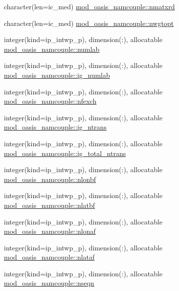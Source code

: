 \begin{DoxyCompactItemize}
\item 
character(len=ic\+\_\+med) \hyperlink{namespacemod__oasis__namcouple_a7cb9d88a57224d84d97afc29b0e606bf}{mod\+\_\+oasis\+\_\+namcouple\+::nmatxrd}
\item 
character(len=ic\+\_\+med) \hyperlink{namespacemod__oasis__namcouple_ad7829e2434eb8214b599ba49395c9fc5}{mod\+\_\+oasis\+\_\+namcouple\+::nwgtopt}
\item 
integer(kind=ip\+\_\+intwp\+\_\+p), dimension(\+:), allocatable \hyperlink{namespacemod__oasis__namcouple_a12e1621f5697a0cdbde11d3e25f43b54}{mod\+\_\+oasis\+\_\+namcouple\+::numlab}
\item 
integer(kind=ip\+\_\+intwp\+\_\+p), dimension(\+:), allocatable \hyperlink{namespacemod__oasis__namcouple_ab0b9a7822ec44010e8652ed2d6abc0db}{mod\+\_\+oasis\+\_\+namcouple\+::ig\+\_\+numlab}
\item 
integer(kind=ip\+\_\+intwp\+\_\+p), dimension(\+:), allocatable \hyperlink{namespacemod__oasis__namcouple_ac6216c78a2779e49f90a9a95a39c27d7}{mod\+\_\+oasis\+\_\+namcouple\+::nfexch}
\item 
integer(kind=ip\+\_\+intwp\+\_\+p), dimension(\+:), allocatable \hyperlink{namespacemod__oasis__namcouple_ac4549f9f5bbb37fce3edc9a208e0d48b}{mod\+\_\+oasis\+\_\+namcouple\+::ig\+\_\+ntrans}
\item 
integer(kind=ip\+\_\+intwp\+\_\+p), dimension(\+:), allocatable \hyperlink{namespacemod__oasis__namcouple_abbd7bd184bb2a3860063dbb9f109f427}{mod\+\_\+oasis\+\_\+namcouple\+::ig\+\_\+total\+\_\+ntrans}
\item 
integer(kind=ip\+\_\+intwp\+\_\+p), dimension(\+:), allocatable \hyperlink{namespacemod__oasis__namcouple_a6e774d31f16b513b1d604e72a82dff40}{mod\+\_\+oasis\+\_\+namcouple\+::nlonbf}
\item 
integer(kind=ip\+\_\+intwp\+\_\+p), dimension(\+:), allocatable \hyperlink{namespacemod__oasis__namcouple_a9b09ac96dad78313003a9436fe2f9aec}{mod\+\_\+oasis\+\_\+namcouple\+::nlatbf}
\item 
integer(kind=ip\+\_\+intwp\+\_\+p), dimension(\+:), allocatable \hyperlink{namespacemod__oasis__namcouple_ae413f2dc402b7c018e341081b8d6e208}{mod\+\_\+oasis\+\_\+namcouple\+::nlonaf}
\item 
integer(kind=ip\+\_\+intwp\+\_\+p), dimension(\+:), allocatable \hyperlink{namespacemod__oasis__namcouple_a80d81b2f026a2d0dc2de27b9ee04f7af}{mod\+\_\+oasis\+\_\+namcouple\+::nlataf}
\item 
integer(kind=ip\+\_\+intwp\+\_\+p), dimension(\+:), allocatable \hyperlink{namespacemod__oasis__namcouple_a20e9486f3e8bbdcee0de935e9be3a2e8}{mod\+\_\+oasis\+\_\+namcouple\+::nseqn}

\end{DoxyCompactItemize}
